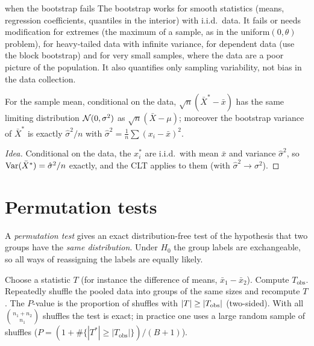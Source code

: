 \begin{nuance}{when the bootstrap fails}
The bootstrap works for smooth statistics (means, regression coefficients, quantiles in the interior) with i.i.d.\ data. It fails or needs modification for extremes (the maximum of a sample, as in the uniform$(0,\theta)$ problem), for heavy-tailed data with infinite variance, for dependent data (use the block bootstrap) and for very small samples, where the data are a poor picture of the population. It also quantifies only sampling variability, not bias in the data collection.
\end{nuance}

\begin{theorem}\label{thm:bootstrap-mean}
For the sample mean, conditional on the data, $\sqrt n(\bar{X}^*-\bar{x})$ has the same limiting distribution $\mathcal{N}(0,\sigma^2)$ as $\sqrt n(\bar{X}-\mu)$; moreover the bootstrap variance of $\bar{X}^*$ is exactly $\hat\sigma^2/n$ with $\hat\sigma^2=\frac1n\sum(x_i-\bar{x})^2$.
\end{theorem}

\begin{proof}[Idea]
Conditional on the data, the $x_i^*$ are i.i.d.\ with mean $\bar{x}$ and variance $\hat\sigma^2$, so $\operatorname{Var}(\bar{X}^*)=\hat\sigma^2/n$ exactly, and the CLT applies to them (with $\hat\sigma^2\to\sigma^2$).
\end{proof}

\section{Permutation tests}

A \emph{permutation test} gives an exact distribution-free test of the hypothesis that two groups have the \emph{same distribution}. Under $H_0$ the group labels are exchangeable, so all ways of reassigning the labels are equally likely.

\begin{definition}
Choose a statistic $T$ (for instance the difference of means, $\bar{x}_1-\bar{x}_2$). Compute $T_{\mathrm{obs}}$. Repeatedly shuffle the pooled data into groups of the same sizes and recompute $T$. The $P$-value is the proportion of shuffles with $\lvert T\rvert\ge\lvert T_{\mathrm{obs}}\rvert$ (two-sided). With all $\binom{n_1+n_2}{n_1}$ shuffles the test is exact; in practice one uses a large random sample of shuffles ($P=(1+\#\{|T^*|\ge|T_{\mathrm{obs}}|\})/(B+1)$).
\end{definition}

